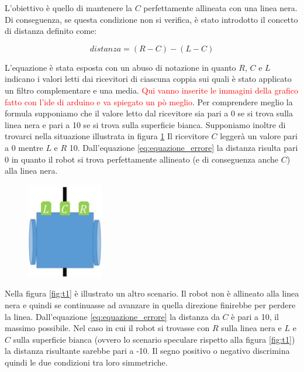 \documentclass[twoside,twocolumn]{article}
\begin{document}
L'obiettivo è quello di mantenere la $C$ perfettamente allineata con una linea nera. Di conseguenza, se questa condizione non si verifica, è stato introdotto il concetto di distanza definito come:

\begin{equation} \label{eq:equazione_errore}
distanza = (R - C) - (L - C)
\end{equation}

L'equazione è stata esposta con un abuso di notazione in quanto $R$, $C$ e $L$ indicano i valori letti dai ricevitori di ciascuna coppia sui quali è stato applicato un filtro complementare e una media.  \textcolor{red}{Qui vanno inserite le immagini della grafico fatto con l'ide di arduino e va spiegato un pò meglio}. Per comprendere meglio la formula supponiamo che il valore letto dal ricevitore sia pari a 0 se si trova sulla linea nera e pari a 10 se si trova sulla superficie bianca. Supponiamo inoltre di trovarci nella situazione illustrata in figura \ref{fig:t0}
Il ricevitore $C$ leggerà un valore pari a 0 mentre $L$ e $R$ 10. Dall'equazione \ref{eq:equazione_errore} la distanza risulta pari 0 in quanto il robot si trova perfettamente allineato (e di conseguenza anche $C$) alla linea nera.

\begin{figure}[h]
	\centering
	\includegraphics[width=0.3\textwidth]{immagini/t0}
	\caption{}
	\label{fig:t0}
\end{figure}

Nella figura \ref{fig:t1} è illustrato un altro scenario. Il robot non è allineato alla linea nera e quindi se continuasse ad avanzare in quella direzione finirebbe per perdere la linea. Dall'equazione \ref{eq:equazione_errore} la distanza da $C$ è pari a 10, il massimo possibile. Nel caso in cui il robot si trovasse con $R$ sulla linea nera e $L$ e $C$ sulla superficie bianca (ovvero lo scenario speculare rispetto alla figura \ref{fig:t1}) la distanza risultante sarebbe pari a -10. Il segno positivo o negativo discrimina quindi le due condizioni tra loro simmetriche.
\end{document}
